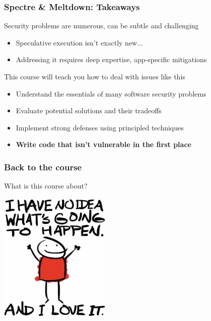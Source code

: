\documentclass[10pt,handout]{beamer}
\begin{document}

\begin{frame}

\frametitle{Spectre \& Meltdown: Takeaways}

Security problems are numerous, can be subtle and challenging
\begin{itemize}
  \item Speculative execution isn't exactly new...
  \item Addressing it requires deep expertise, app-specific mitigations \\[2em]
\end{itemize}

\pause
This course will teach you how to deal with issues like this
\begin{itemize}
  \item Understand the essentials of many software security problems
  \item Evaluate potential solutions and their tradeoffs
  \item Implement strong defenses using principled techniques
  \item \textbf{Write code that isn't vulnerable in the first place}
\end{itemize}

\end{frame}


\begin{frame}

\frametitle{Back to the course}

What is this course about?
\\[2em]

\centering

\includegraphics[width=0.4\textwidth]{whathappens.png}

\end{frame}
\end{document}
